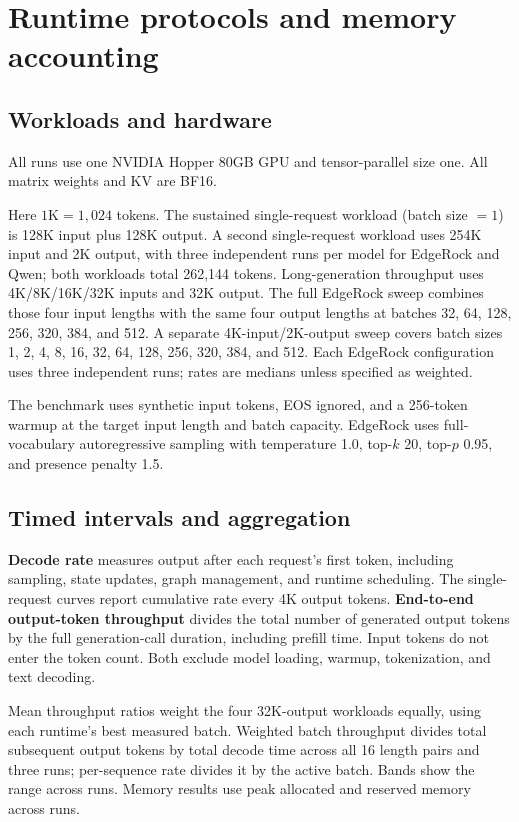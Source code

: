 \FloatBarrier
\section{Runtime protocols and memory accounting}
\label{app:runtime}

\subsection{Workloads and hardware}
All runs use one NVIDIA Hopper 80GB GPU and tensor-parallel size one. All matrix weights and KV are BF16.

Here $1\mathrm{K}=1{,}024$ tokens. The sustained single-request workload (batch size $=1$) is 128K input plus 128K output. A second single-request workload uses 254K input and 2K output, with three independent runs per model for EdgeRock and Qwen; both workloads total 262,144 tokens. Long-generation throughput uses 4K/8K/16K/32K inputs and 32K output. The full EdgeRock sweep combines those four input lengths with the same four output lengths at batches 32, 64, 128, 256, 320, 384, and 512. A separate 4K-input/2K-output sweep covers batch sizes 1, 2, 4, 8, 16, 32, 64, 128, 256, 320, 384, and 512. Each EdgeRock configuration uses three independent runs; rates are medians unless specified as weighted.

The benchmark uses synthetic input tokens, EOS ignored, and a 256-token warmup at the target input length and batch capacity. EdgeRock uses full-vocabulary autoregressive sampling with temperature 1.0, top-$k$ 20, top-$p$ 0.95, and presence penalty 1.5.

\subsection{Timed intervals and aggregation}
\textbf{Decode rate} measures output after each request's first token, including sampling, state updates, graph management, and runtime scheduling. The single-request curves report cumulative rate every 4K output tokens. \textbf{End-to-end output-token throughput} divides the total number of generated output tokens by the full generation-call duration, including prefill time. Input tokens do not enter the token count. Both exclude model loading, warmup, tokenization, and text decoding.

Mean throughput ratios weight the four 32K-output workloads equally, using each runtime's best measured batch. Weighted batch throughput divides total subsequent output tokens by total decode time across all 16 length pairs and three runs; per-sequence rate divides it by the active batch. Bands show the range across runs. Memory results use peak allocated and reserved memory across runs.

